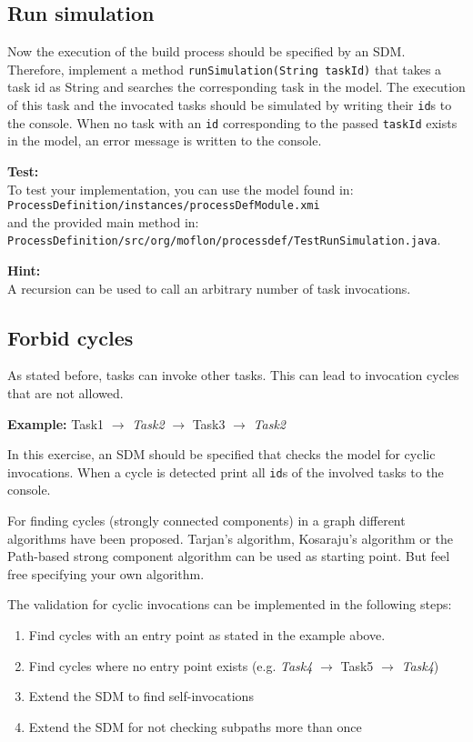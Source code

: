 \subsection{Run simulation}
Now the execution of the build process should be specified by an SDM.
Therefore, implement a method \texttt{runSimulation(String taskId)} that takes a task id as String and searches the corresponding task in the model.
The execution of this task and the invocated tasks should be simulated by writing their \texttt{id}s to the console.
When no task with an \texttt{id} corresponding to the passed \texttt{taskId} exists in the model, an error message is written to the console. 
 
\textbf{Test:}\\ 
To test your implementation, you can use the model found in:\\
\noindent\hspace*{10mm}\texttt{ProcessDefinition\slash instances\slash processDefModule.xmi}\\
and the provided main method in:\\
\noindent\hspace*{10mm}\texttt{ProcessDefinition\slash src\slash org\slash moflon\slash processdef\slash TestRunSimulation.java}.

\textbf{Hint:}\\
A recursion can be used to call an arbitrary number of task invocations. 


\clearpage
\subsection{Forbid cycles}
As stated before, tasks can invoke other tasks. 
This can lead to invocation cycles that are not allowed.


\textbf{Example:}
Task1 $\rightarrow$ \textit{Task2} $\rightarrow$ Task3 $\rightarrow$ \textit{Task2}


In this exercise, an SDM should be specified that checks the model for cyclic invocations.
When a cycle is detected print all \texttt{id}s of the involved tasks to the console.


For finding cycles (strongly connected components) in a graph different algorithms have been proposed. 
Tarjan's algorithm, Kosaraju's algorithm or the Path-based strong component algorithm can be used as starting point.
But feel free specifying your own algorithm.

The validation for cyclic invocations can be implemented in the following steps:
\begin{enumerate}
\item Find cycles with an entry point as stated in the example above.
\item Find cycles where no entry point exists (e.g. \textit{Task4} $\rightarrow$ Task5 $\rightarrow$ \textit{Task4})
\item Extend the SDM to find self-invocations 
\item Extend the SDM for not checking subpaths more than once
\end{enumerate}

